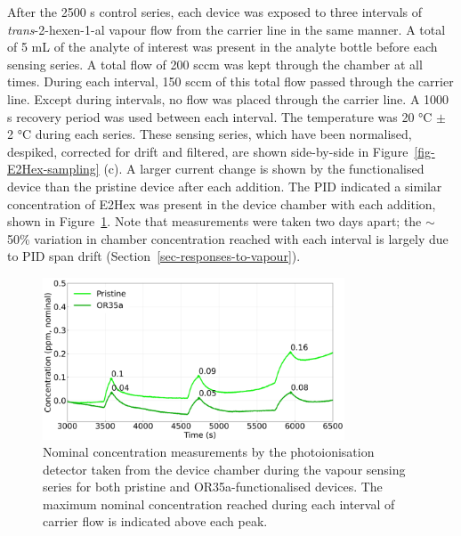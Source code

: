 \documentclass[
  a4paper,
]{scrbook}
\begin{document}
After the 2500 s control series, each device was exposed to three
intervals of \emph{trans}-2-hexen-1-al vapour flow from the carrier line
in the same manner. A total of 5 mL of the analyte of interest was
present in the analyte bottle before each sensing series. A total flow
of 200 sccm was kept through the chamber at all times. During each
interval, 150 sccm of this total flow passed through the carrier line.
Except during intervals, no flow was placed through the carrier line. A
1000 s recovery period was used between each interval. The temperature
was 20 °C \(\pm\) 2 °C during each series. These sensing series, which
have been normalised, despiked, corrected for drift and filtered, are
shown side-by-side in Figure~\ref{fig-E2Hex-sampling} (c). A larger
current change is shown by the functionalised device than the pristine
device after each addition. The PID indicated a similar concentration of
E2Hex was present in the device chamber with each addition, shown in
Figure~\ref{fig-E2Hex-additions-PID}. Note that measurements were taken
two days apart; the \(\sim\) 50\% variation in chamber concentration
reached with each interval is largely due to PID span drift
(Section~\ref{sec-responses-to-vapour}).

\begin{figure}

{\centering \includegraphics[width=0.8\textwidth,height=\textheight]{figures/ch9/input_time_comparison.png}

}

\caption[Nominal concentration measurements by the photoionisation
detector taken from the device chamber during the vapour sensing series
for both pristine and OR35a-functionalised
devices.]{\label{fig-E2Hex-additions-PID}Nominal concentration
measurements by the photoionisation detector taken from the device
chamber during the vapour sensing series for both pristine and
OR35a-functionalised devices. The maximum nominal concentration reached
during each interval of carrier flow is indicated above each peak.}

\end{figure}
\end{document}
